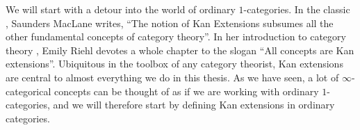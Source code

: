 \documentclass[../../thesis.tex]{subfiles}
\begin{document}
We will start with a detour into the world of ordinary $1$-categories.
In the classic \cite{MacLane}, Saunders MacLane writes, ``The notion of Kan Extensions subsumes all the other fundamental concepts of category theory''.
In her introduction to category theory \cite{CatContext}, Emily Riehl devotes a whole chapter to the slogan ``All concepts are Kan extensions''.
Ubiquitous in the toolbox of any category theorist, Kan extensions are central to almost everything we do in this thesis.
As we have seen, a lot of $\infty$-categorical concepts can be thought of as if we are working with ordinary $1$-categories, and we will therefore start by defining Kan extensions in ordinary categories.
\end{document}
